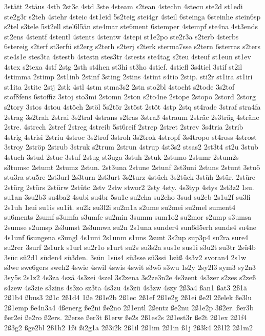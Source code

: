 {3stätt
2stäus
4stb
2st3c
4std
3ste
4steam
s2tean
4stechn
4stecu
ste2d
st1edi
ste2g3r
s2teh
4stehr
4steic
4st1eid
5s2teig
stei4gr
4steil
6steinga
6steinhe
stein6sp
s2tel
s3tele
5st2ell
stel6l5än
ste4mar
ste6ment
6stemper
4stempf
ste4na
4st3ends
st2ens
4stentf
4stentl
4stents
4stentw
4stepi
st1e2po
ste2r3a
s2terb
4sterbs
6stereig
s2terf
st3erfü
st2erg
s2terh
s2terj
s2terk
sterma7sse
s2tern
6sterras
s2ters
ste4s1e
stes3ta
4stestb
4stestn
stes3tr
4stests
ste4tag
s2teu
4steuf
st1eun
st1ev
4stex
s2texa
4stf
2stg
2sth
st4hen
st3hi
st3ho
4stief.
4stiefl
3s4tiel
3stif
st2il
4stimma
2stimp
2st1inb
2stinf
3sting
2stins
4stint
s4tio
2stip.
sti2r
st1ira
st1iri
st1ita
2stite
2stj
2stk
4stl
4stm
stma3s2
2stn
sto2bl
4stocht
s2tode
3s2tof
stof8fens
6stoffiz
3stoj
sto3mi
2stomn
2ston
s2to4ne
2stope
2stopo
2stord
2storg
s2tory
3stos
4stou
4stöch
2stöl
5s2tör
2stöst
2stöt
4stp
2stq
st4rade
3straf
stra4fa
2strag
3s2trah
2strai
3s2tral
4strans
s2tras
3straß
4straum
2sträc
2s3träg
4sträne
2stre.
4strech
2stref
2streg
4streib
5st6reif
2strep
2stret
2strev
3s4tria
2strib
4strig
4strisi
2striu
4stroc
3s2trof
3stroh
3s2trok
4stropf
3s4tropo
st4ross
4strost
3stroy
2ströp
2strub
3struk
s2trum
2strun
4strup
4st3s2
stsas2
2st3t4
st2u
3stub
4stuch
3stud
2stue
3stuf
2stug
st3uga
3stuh
2stuk
2stumo
2stumr
2stum2s
s3tumsc
2stumt
2stumz
2stun.
2st3una
2stune
2stunf
2st3uni
2stuns
2stunt
3stuö
stu3ra
stu5re
2st3url
2s3turn
2st3urt
3s2turz
4stüch
3s2tück
3stüh
2stür.
2stüre
2stürg
2stürs
2stürw
2stütc
2stv
2stw
stwor2
2sty
4sty.
4s3typ
4stys
2st3z2
1su.
su1an
3su2b3
su4ba2
4subi
su4br
5su1c
su2cha
su2cho
3sud
su2eb
2s1u2f
su3fi
2s1uh
1sui
su1is
su1it.
su2k
su3l2i
su2m1a
s2ume
su2mei
su2mel
sument4
su6ments
2sumf
s3umfa
s3umfe
su2min
3summ
sum1o2
su2mor
s2ump
s3umsa
2sumse
s2umsp
2s3umst
2s3umwa
su2n
2s1una
sunder4
sun6d5erh
sunds4
su4ne
4s1unf
6sungena
s3ungl
4s1uni
2s1unm
s1uns
2sunt
3s2up
sup3p4
su2ra
sure4
su2rer
3surf
2s1urk
s1url
su2r1o
s1urt
su2s
su3s2a
sus1e
sus1i
s3u2t
su3tr
2sü4b
3süc
sü2d1
süden4
sü3den.
3sün
1süs4
sü3sse
sü3ssi
1süß
4s3v2
svoran4
2s1w
s3we
swe6gers
sweh2
4swie
4swil
4swis
4swit
s3wö
s3wu
1s2y
2sy2l3
sym3
sy2n3
3sy5s
2s1z2
4s3za
4szä
4s3zei
4szel
3s2zena
3s2ze3n2e
4s3zent
4s3zer
s2zes
s2zeß
s4zew
4s3zie
s3zins
4s3zo
sz3ta
4s3zu
4s3zü
4s3zw
4szy
2ß3a4
ßan1
ßat3
2ß1ä
2ß1b4
ßbus3
2ß1c
2ß1d4
1ße
2ß1e2b
2ß1ec
2ß1ef
2ß1e2g
2ß1ei
ße2l
2ßelek
ße3lu
2ß1emp
ße4n3a4
4ßenerg
ße2ni
ße2no
2ß1entl
2ßentz
ße2nu
2ß1e2p
3ß2er.
ßer3b
ßer2ei
ße2ro
ß2ers.
2ßerse
ßer3t
ß1erw
ße2s
2ß1es2s
2ß1est3r
ße2t
2ß1ex
2ß1f4
2ß3g2
ßge2bl
2ß1h2
1ßi
ßi2g1a
2ß3i2k
2ß1il
2ß1im
2ß1in
ß1j
2ß3k4
2ß1l2
2ß1m2
}
